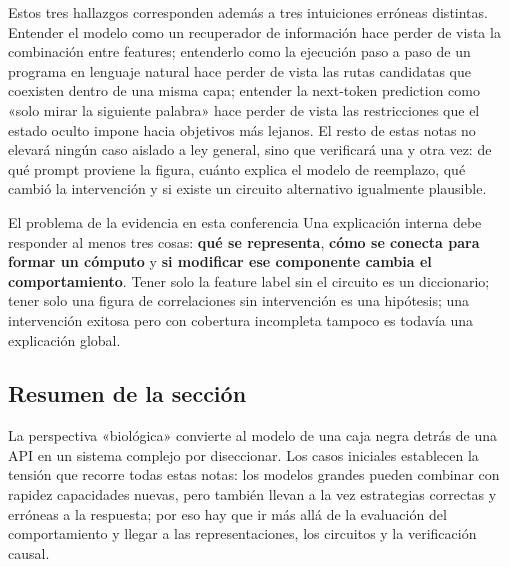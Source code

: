 Estos tres hallazgos corresponden además a tres intuiciones erróneas distintas. Entender el modelo como un recuperador de información hace perder de vista la combinación entre features; entenderlo como la ejecución paso a paso de un programa en lenguaje natural hace perder de vista las rutas candidatas que coexisten dentro de una misma capa; entender la next-token prediction como «solo mirar la siguiente palabra» hace perder de vista las restricciones que el estado oculto impone hacia objetivos más lejanos. El resto de estas notas no elevará ningún caso aislado a ley general, sino que verificará una y otra vez: de qué prompt proviene la figura, cuánto explica el modelo de reemplazo, qué cambió la intervención y si existe un circuito alternativo igualmente plausible.

\begin{importantbox}{El problema de la evidencia en esta conferencia}
Una explicación interna debe responder al menos tres cosas: \textbf{qué se representa}, \textbf{cómo se conecta para formar un cómputo} y \textbf{si modificar ese componente cambia el comportamiento}. Tener solo la feature label sin el circuito es un diccionario; tener solo una figura de correlaciones sin intervención es una hipótesis; una intervención exitosa pero con cobertura incompleta tampoco es todavía una explicación global.
\end{importantbox}

\subsection{Resumen de la sección}

La perspectiva «biológica» convierte al modelo de una caja negra detrás de una API en un sistema complejo por diseccionar. Los casos iniciales establecen la tensión que recorre todas estas notas: los modelos grandes pueden combinar con rapidez capacidades nuevas, pero también llevan a la vez estrategias correctas y erróneas a la respuesta; por eso hay que ir más allá de la evaluación del comportamiento y llegar a las representaciones, los circuitos y la verificación causal.
